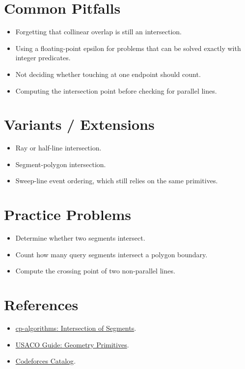 \section*{Common Pitfalls}

\begin{itemize}
  \item Forgetting that collinear overlap is still an intersection.
  \item Using a floating-point epsilon for problems that can be solved exactly with integer predicates.
  \item Not deciding whether touching at one endpoint should count.
  \item Computing the intersection point before checking for parallel lines.
\end{itemize}

\section*{Variants / Extensions}

\begin{itemize}
  \item Ray or half-line intersection.
  \item Segment-polygon intersection.
  \item Sweep-line event ordering, which still relies on the same primitives.
\end{itemize}

\section*{Practice Problems}

\begin{itemize}
  \item Determine whether two segments intersect.
  \item Count how many query segments intersect a polygon boundary.
  \item Compute the crossing point of two non-parallel lines.
\end{itemize}

\section*{References}

\begin{itemize}
  \item \href{https://cp-algorithms.com/geometry/segments-intersection.html}{cp-algorithms: Intersection of Segments}.
  \item \href{https://usaco.guide/plat/geo-prims}{USACO Guide: Geometry Primitives}.
  \item \href{https://codeforces.com/catalog}{Codeforces Catalog}.
\end{itemize}
